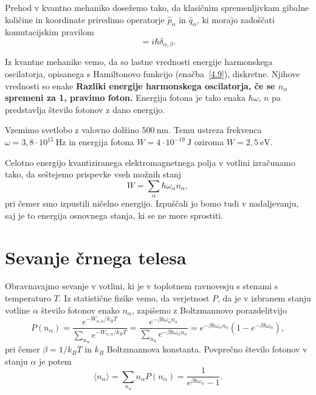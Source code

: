 Prehod v kvantno mehaniko dosežemo tako, da klasičnim spremenljivkam gibalne količine
in koordinate priredimo operatorje $\hat{p}_{\alpha}$ in $\hat{q}_{\alpha}$,
ki morajo zadoščati komutacijskim pravilom 
\begin{equation}
[\hat{q}_{\alpha},\hat{p}_{\beta}]=i\hbar \delta_{\alpha, \beta}.
\label{4.10}
\end{equation}

Iz kvantne mehanike vemo, da so lastne vrednosti energije harmonskega oscilatorja, 
opisanega s Hamiltonovo funkcijo (enačba~\ref{4.9}), diskretne. Njihove vrednosti so enake
{\bf Razliki energije harmonskega oscilatorja, če se $n_{\alpha}$
spremeni za 1, pravimo foton.} Energija
fotona je tako enaka $\hbar \omega$, $n$ pa predstavlja število fotonov z dano energijo.

\begin{remark}
Vzemimo svetlobo z valovno dolžino $500~\si{\nano\metre}$. Temu ustreza frekvenca
$\omega = 3,8 \cdot 10^{15}~\si{\hertz}$ in energija fotona $W = 4 \cdot 10^{-19}~\si{\joule}$
oziroma $W = 2,5~\mathrm{e}\si{\volt}$.
\end{remark}

Celotno energijo kvantiziranega elektromagnetnega polja v votlini
izračunamo tako, da seštejemo prispevke vseh možnih stanj
\begin{equation}
W=\sum_{\alpha}\hbar\omega_{\alpha}n_{\alpha},
\end{equation}
pri čemer smo izpustili ničelno energijo. 
Izpuščali jo bomo tudi v nadaljevanju, saj
je to energija osnovnega stanja, ki se ne more sprostiti. 

\section{Sevanje črnega telesa}
Obravnavajmo sevanje v votlini, ki je v toplotnem ravnovesju s stenami s temperaturo
$T$. Iz statistične fizike vemo, da verjetnost $P$, da je v izbranem stanju 
votline $\alpha$ število fotonov enako $n_{\alpha}$, zapišemo z Boltzmannovo porazdelitvijo
\begin{equation}
P(n_{\alpha})=\frac{e^{-W_{n,\alpha}/k_BT}}{\sum_{n_{\alpha}}e^{-W_{n,\alpha}/k_BT}} = 
\frac{e^{-\beta\hbar\omega_{\alpha}n_{\alpha}}}
{\sum_{n_{\alpha}}e^{-\beta\hbar\omega_{\alpha}n_{\alpha}}}=
e^{-\beta\hbar\omega_{\alpha}n_{\alpha}}(1-e^{-\beta\hbar\omega_{\alpha}}),
\label{4.12}
\end{equation}
pri čemer $\beta = 1/k_BT$ in $k_B$ Boltzmannova konstanta. Povprečno število fotonov 
v stanju $\alpha$ je potem
\begin{equation}
\langle n_{\alpha}\rangle =\sum_{n_{\alpha}}n_{\alpha}P(n_{\alpha})=\frac{1}{e^{\beta\hbar\omega_{\alpha}}-1}.
\label{4.13}
\end{equation}

